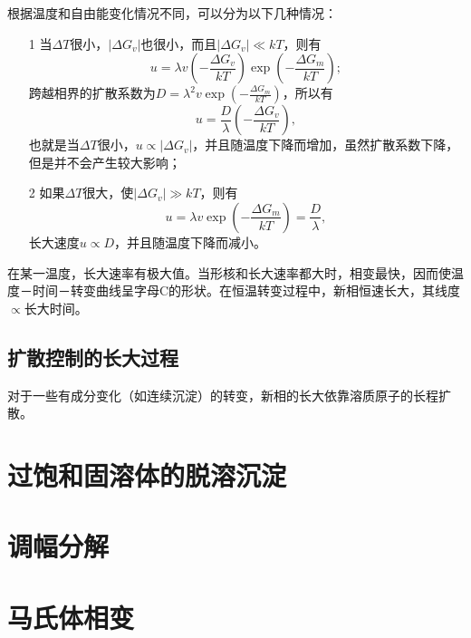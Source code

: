             根据温度和自由能变化情况不同，可以分为以下几种情况：
            \begin{itemize}
                \item[1] 当$\Delta T$很小，$|\Delta G_v|$也很小，而且$|\Delta G_v|\ll kT$，则有
                        \begin{equation}
                            u=\lambda v\left(-\frac{\Delta G_{v}}{k T}\right) \exp \left(-\frac{\Delta G_{m}}{k T}\right);
                        \end{equation} 
                        跨越相界的扩散系数为$D=\lambda^2v \exp \left( -\frac{\Delta G_m}{kT} \right)$，所以有
                        \begin{equation}
                            u=\frac{D}{\lambda}\left(-\frac{\Delta G_{v}}{k T}\right),
                        \end{equation}
                        也就是当$\Delta T$很小，$u\propto|\Delta G_v|$，并且随温度下降而增加，虽然扩散系数下降，但是并不会产生较大影响；
                \item[2] 如果$\Delta T$很大，使$|\Delta G_v|\gg kT$，则有
                        \begin{equation}
                            u=\lambda v \exp \left(-\frac{\Delta G_{m}}{k T}\right)=\frac{D}{\lambda},
                        \end{equation} 
                        长大速度$u\propto D$，并且随温度下降而减小。
            \end{itemize}
            在某一温度，长大速率有极大值。当形核和长大速率都大时，相变最快，因而使温度－时间－转变曲线呈字母C的形状。在恒温转变过程中，新相恒速长大，其线度$\propto$长大时间。
        \subsection{扩散控制的长大过程}
            对于一些有成分变化（如连续沉淀）的转变，新相的长大依靠溶质原子的长程扩散。

            
    \section{过饱和固溶体的脱溶沉淀}
    \section{调幅分解}
    \section{马氏体相变}